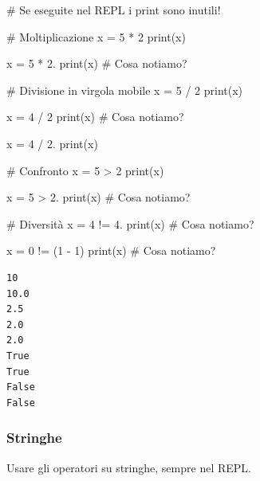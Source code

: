 \documentclass[
  letterpaper,
]{scrbook}
\newenvironment{Shaded}{\begin{snugshade}}{\end{snugshade}}
\newcommand{\BuiltInTok}[1]{\textcolor[rgb]{0.00,0.23,0.31}{#1}}
\newcommand{\CommentTok}[1]{\textcolor[rgb]{0.37,0.37,0.37}{#1}}
\newcommand{\DecValTok}[1]{\textcolor[rgb]{0.68,0.00,0.00}{#1}}
\newcommand{\FloatTok}[1]{\textcolor[rgb]{0.68,0.00,0.00}{#1}}
\newcommand{\NormalTok}[1]{\textcolor[rgb]{0.00,0.23,0.31}{#1}}
\newcommand{\OperatorTok}[1]{\textcolor[rgb]{0.37,0.37,0.37}{#1}}
\begin{document}
\begin{Shaded}
\begin{Highlighting}[]
\CommentTok{\# Se eseguite nel REPL i print sono inutili!}

\CommentTok{\# Moltiplicazione}
\NormalTok{x }\OperatorTok{=} \DecValTok{5} \OperatorTok{*} \DecValTok{2}
\BuiltInTok{print}\NormalTok{(x)}

\NormalTok{x }\OperatorTok{=} \DecValTok{5} \OperatorTok{*} \FloatTok{2.}
\BuiltInTok{print}\NormalTok{(x) }\CommentTok{\# Cosa notiamo?}

\CommentTok{\# Divisione in virgola mobile}
\NormalTok{x }\OperatorTok{=} \DecValTok{5} \OperatorTok{/} \DecValTok{2}
\BuiltInTok{print}\NormalTok{(x)}

\NormalTok{x }\OperatorTok{=} \DecValTok{4} \OperatorTok{/} \DecValTok{2}
\BuiltInTok{print}\NormalTok{(x) }\CommentTok{\# Cosa notiamo?}

\NormalTok{x }\OperatorTok{=} \DecValTok{4} \OperatorTok{/} \FloatTok{2.}
\BuiltInTok{print}\NormalTok{(x)}

\CommentTok{\# Confronto}
\NormalTok{x }\OperatorTok{=} \DecValTok{5} \OperatorTok{\textgreater{}} \DecValTok{2}
\BuiltInTok{print}\NormalTok{(x)}

\NormalTok{x }\OperatorTok{=} \DecValTok{5} \OperatorTok{\textgreater{}} \FloatTok{2.}
\BuiltInTok{print}\NormalTok{(x) }\CommentTok{\# Cosa notiamo?}

\CommentTok{\# Diversità}
\NormalTok{x }\OperatorTok{=} \DecValTok{4} \OperatorTok{!=} \FloatTok{4.}
\BuiltInTok{print}\NormalTok{(x) }\CommentTok{\# Cosa notiamo?}

\NormalTok{x }\OperatorTok{=} \DecValTok{0} \OperatorTok{!=}\NormalTok{ (}\DecValTok{1} \OperatorTok{{-}} \DecValTok{1}\NormalTok{)}
\BuiltInTok{print}\NormalTok{(x) }\CommentTok{\# Cosa notiamo?}
\end{Highlighting}
\end{Shaded}

\begin{verbatim}
10
10.0
2.5
2.0
2.0
True
True
False
False
\end{verbatim}

\subsubsection{Stringhe}\label{stringhe-1}

\begin{tcolorbox}[enhanced jigsaw, leftrule=.75mm, arc=.35mm, opacityback=0, rightrule=.15mm, titlerule=0mm, colbacktitle=quarto-callout-tip-color!10!white, colback=white, colframe=quarto-callout-tip-color-frame, bottomrule=.15mm, toprule=.15mm, bottomtitle=1mm, toptitle=1mm, title=\textcolor{quarto-callout-tip-color}{\faLightbulb}\hspace{0.5em}{Suggerimento}, breakable, coltitle=black, opacitybacktitle=0.6, left=2mm]

Usare gli operatori su stringhe, sempre nel REPL.

\end{tcolorbox}
\end{document}
